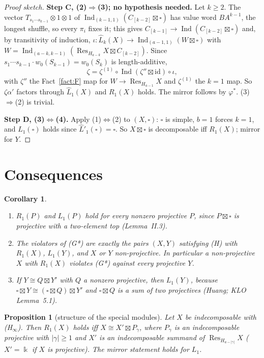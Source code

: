 \documentclass[11pt]{amsart}
\newcommand{\Ind}{\operatorname{Ind}}
\newcommand{\Res}{\operatorname{Res}}
\newcommand{\kk}{\Bbbk}
\newcommand{\sq}{\boxtimes}
\newcommand{\bx}{\square}
\newcommand{\Lh}{\widehat L}
\theoremstyle{plain}
\newtheorem{proposition}[theorem]{Proposition}
\newtheorem{corollary}[theorem]{Corollary}
\theoremstyle{definition}
\begin{document}
\begin{proof}[Proof sketch]
\textbf{Step C, (2)$\Rightarrow$(3); no hypothesis needed.} Let $k\ge2$. The vector $T_{s_1\cdots s_{k-1}}\otimes1\otimes1$ of $\Ind_{(k-1,1)}(C_{[k-2]}\sq\bx)$ has value word $BA^{k-1}$, the longest shuffle, so every $\pi_i$ fixes it; this gives $C_{[k-1]}\to\Ind(C_{[k-2]}\sq\bx)$ and, by transitivity of induction, $\iota:\Lh_k(X)\to\Ind_{(a-1,1)}(W\sq\bx)$ with $W=\Ind_{(a-k,k-1)}(\Res_{H_{a-k}}X\sq C_{[k-2]})$. Since $s_1\cdots s_{k-1}\cdot w_0(S_{k-1})=w_0(S_k)$ is length-additive,
\[
\zeta=\zeta^{(1)}\circ\Ind(\zeta''\sq\mathrm{id})\circ\iota,
\]
with $\zeta''$ the Fact~\ref{fact:F} map for $W\to\Res_{H_{a-1}}X$ and $\zeta^{(1)}$ the $k=1$ map. So $\zeta\alpha'$ factors through $\Lh_1(X)$ and $R_1(X)$ holds. The mirror follows by $\varphi^*$. (3)$\Rightarrow$(2) is trivial.

\textbf{Step D, (3)$\Leftrightarrow$(4).} Apply (1)$\Leftrightarrow$(2) to $(X,\bx)$: $\bx$ is simple, $b=1$ forces $k=1$, and $L_1(\bx)$ holds since $\Lh'_1(\bx)=\bx$. So $X\sq\bx$ is decomposable iff $R_1(X)$; mirror for $Y$.
\end{proof}

\section{Consequences}

\begin{corollary}\label{cor:proj}
\begin{enumerate}[label=(\alph*),itemsep=1pt]
\item $R_1(P)$ and $L_1(P)$ hold for every nonzero projective $P$, since $P\sq\bx$ is projective with a two-element top (Lemma~II.3).
\item The violators of (G*) are \emph{exactly} the pairs $(X,Y)$ satisfying (H) with $R_1(X)$, $L_1(Y)$, and $X$ or $Y$ non-projective. In particular a non-projective $X$ with $R_1(X)$ violates (G*) against every projective $Y$.
\item If $Y\cong Q\sq Y'$ with $Q$ a nonzero projective, then $L_1(Y)$, because $\bx\sq Y\cong(\bx\sq Q)\sq Y'$ and $\bx\sq Q$ is a sum of two projectives (Huang; KLO Lemma~5.1).
\end{enumerate}
\end{corollary}

\begin{proposition}[structure of the special modules]\label{prop:S}
Let $X$ be indecomposable with (H$_\infty$). Then $R_1(X)$ holds iff $X\cong X'\sq P_\gamma$, where $P_\gamma$ is an indecomposable projective with $|\gamma|\ge1$ and $X'$ is an indecomposable summand of $\Res_{H_{a-|\gamma|}}X$ ($X'=\kk$ if $X$ is projective). The mirror statement holds for $L_1$.
\end{proposition}
\end{document}
